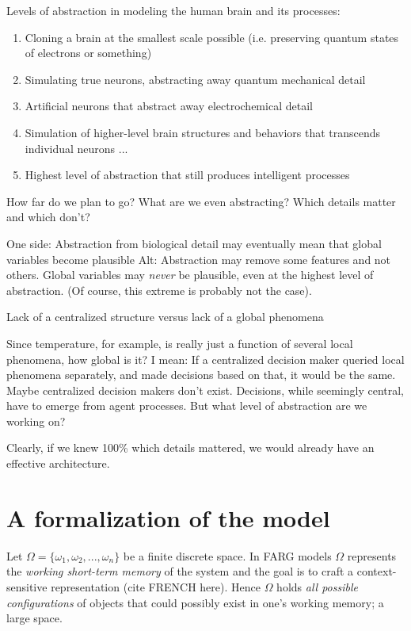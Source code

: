 \documentclass[a4paper]{article}
\begin{document}
Levels of abstraction in modeling the human brain and its processes:
\begin{enumerate}
	\item Cloning a brain at the smallest scale possible (i.e. preserving quantum states of electrons or something)
    \item Simulating true neurons, abstracting away quantum mechanical detail
    \item Artificial neurons that abstract away electrochemical detail
    \item Simulation of higher-level brain structures and behaviors that transcends individual neurons
    ...
    \item Highest level of abstraction that still produces intelligent processes
\end{enumerate}

How far do we plan to go? What are we even abstracting? Which details matter and which don't?

One side: Abstraction from biological detail may eventually mean that global variables become plausible
Alt: Abstraction may remove some features and not others. Global variables may \emph{never} be plausible, even at the highest level of abstraction. (Of course, this extreme is probably not the case).

Lack of a centralized structure versus lack of a global phenomena

Since temperature, for example, is really just a function of several local phenomena, how global is it? I mean: If a centralized decision maker queried local phenomena separately, and made decisions based on that, it would be the same. Maybe centralized decision makers don't exist. Decisions, while seemingly central, have to emerge from agent processes. But what level of abstraction are we working on? 

Clearly, if we knew 100\% which details mattered, we would already have an effective architecture.


\section{A formalization of the model}

Let $\Omega = \{\omega_1, \omega_2, ..., \omega_n\}$ be a finite discrete space.  In FARG models $\Omega$ represents the \emph{working short-term memory} of the system and the goal is to craft a context-sensitive representation (cite FRENCH here).  Hence $\Omega$ holds \emph{all possible configurations} of objects that could possibly exist in one's working memory; a large space. 
\end{document}
